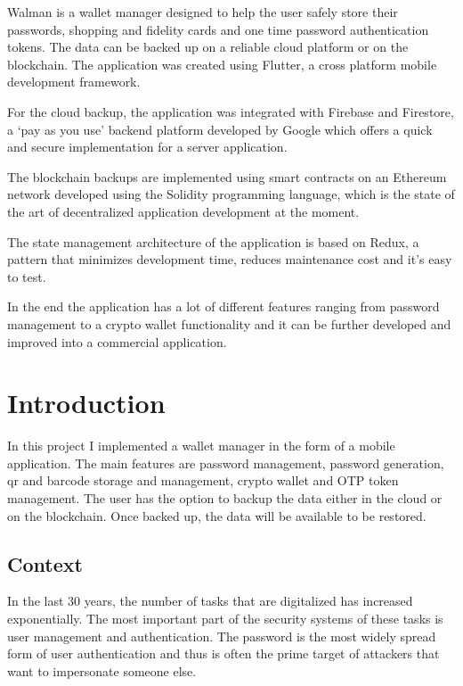 \documentclass[a4paper,12pt]{report}
\begin{document}
\bigskip
\bigskip
\bigskip

Walman is a wallet manager designed to help the user safely store their
passwords, shopping and fidelity cards and one time password authentication
tokens. The data can be backed up on a reliable cloud platform or on the
blockchain. The application was created using Flutter, a cross platform mobile
development framework.

For the cloud backup, the application was integrated with Firebase and
Firestore, a `pay as you use' backend platform developed by Google which offers
a quick and secure implementation for a server application.

The blockchain backups are implemented using smart contracts on an Ethereum
network developed using the Solidity programming language, which is the state
of the art of decentralized application development at the moment.

The state management architecture of the application is based on Redux, a
pattern that minimizes development time, reduces maintenance cost and it's easy
to test.

In the end the application has a lot of different features ranging from
password management to a crypto wallet functionality and it can be further
developed and improved into a commercial application.

\tableofcontents

\chapter{Introduction}
In this project I implemented a wallet manager in the form of a mobile
application. The main features are password management, password generation, qr
and barcode storage and management, crypto wallet and OTP token management. The
user has the option to backup the data either in the cloud or on the
blockchain. Once backed up, the data will be available to be restored.

\section{Context}

\par In the last 30 years, the number of tasks that are digitalized has increased
exponentially. The most important part of the security systems of these tasks
is user management and authentication. The password is the most widely spread
form of user authentication and thus is often the prime target of attackers
that want to impersonate someone else.
\end{document}
